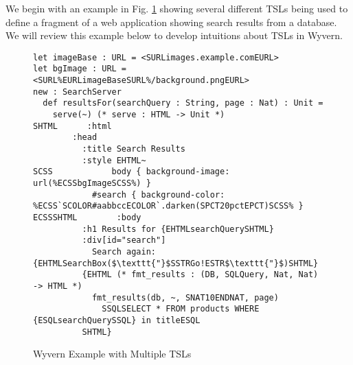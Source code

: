We begin with an example in Fig. \ref{f-example} showing several different TSLs being used to define a fragment of a web application showing search results from a database. We will review this example below to develop intuitions about TSLs in Wyvern. 
\begin{figure}[t]
\begin{lstlisting}
let imageBase : URL = <SURLimages.example.comEURL>
let bgImage : URL = <SURL%EURLimageBaseSURL%/background.pngEURL>
new : SearchServer
  def resultsFor(searchQuery : String, page : Nat) : Unit =
    serve(~) (* serve : HTML -> Unit *)
SHTML      :html
        :head
          :title Search Results
          :style EHTML~
SCSS            body { background-image: url(%ECSSbgImageSCSS%) }
            #search { background-color: %ECSS`SCOLOR#aabbccECOLOR`.darken(SPCT20pctEPCT)SCSS% }
ECSSSHTML        :body
          :h1 Results for {EHTMLsearchQuerySHTML}
          :div[id="search"]
            Search again: {EHTMLSearchBox($\texttt{"}$SSTRGo!ESTR$\texttt{"}$)SHTML}
          {EHTML (* fmt_results : (DB, SQLQuery, Nat, Nat) -> HTML *)
            fmt_results(db, ~, SNAT10ENDNAT, page)
              SSQLSELECT * FROM products WHERE {ESQLsearchQuerySSQL} in titleESQL
          SHTML}
\end{lstlisting}
\vspace{-8px}
\caption{Wyvern Example with Multiple TSLs}
\label{f-example}
\vspace{-10px}
\end{figure}
